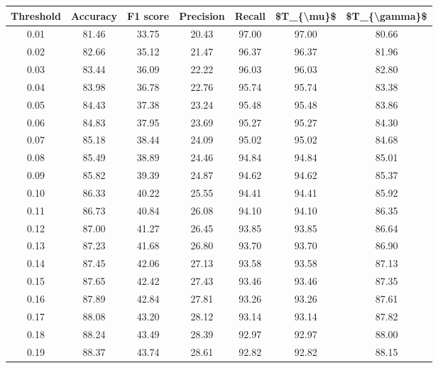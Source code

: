 \begin{tabular}{|c|c|c|c|c|c|c|}
\hline
 Threshold &  Accuracy &  F1 score &  Precision &  Recall &  \$T\_\{\textbackslash mu\}\$ &  \$T\_\{\textbackslash gamma\}\$ \\
\hline
      0.01 &     81.46 &     33.75 &      20.43 &   97.00 &      97.00 &         80.66 \\
      0.02 &     82.66 &     35.12 &      21.47 &   96.37 &      96.37 &         81.96 \\
      0.03 &     83.44 &     36.09 &      22.22 &   96.03 &      96.03 &         82.80 \\
      0.04 &     83.98 &     36.78 &      22.76 &   95.74 &      95.74 &         83.38 \\
      0.05 &     84.43 &     37.38 &      23.24 &   95.48 &      95.48 &         83.86 \\
      0.06 &     84.83 &     37.95 &      23.69 &   95.27 &      95.27 &         84.30 \\
      0.07 &     85.18 &     38.44 &      24.09 &   95.02 &      95.02 &         84.68 \\
      0.08 &     85.49 &     38.89 &      24.46 &   94.84 &      94.84 &         85.01 \\
      0.09 &     85.82 &     39.39 &      24.87 &   94.62 &      94.62 &         85.37 \\
      0.10 &     86.33 &     40.22 &      25.55 &   94.41 &      94.41 &         85.92 \\
      0.11 &     86.73 &     40.84 &      26.08 &   94.10 &      94.10 &         86.35 \\
      0.12 &     87.00 &     41.27 &      26.45 &   93.85 &      93.85 &         86.64 \\
      0.13 &     87.23 &     41.68 &      26.80 &   93.70 &      93.70 &         86.90 \\
      0.14 &     87.45 &     42.06 &      27.13 &   93.58 &      93.58 &         87.13 \\
      0.15 &     87.65 &     42.42 &      27.43 &   93.46 &      93.46 &         87.35 \\
      0.16 &     87.89 &     42.84 &      27.81 &   93.26 &      93.26 &         87.61 \\
      0.17 &     88.08 &     43.20 &      28.12 &   93.14 &      93.14 &         87.82 \\
      0.18 &     88.24 &     43.49 &      28.39 &   92.97 &      92.97 &         88.00 \\
      0.19 &     88.37 &     43.74 &      28.61 &   92.82 &      92.82 &         88.15 \\

\end{tabular}
